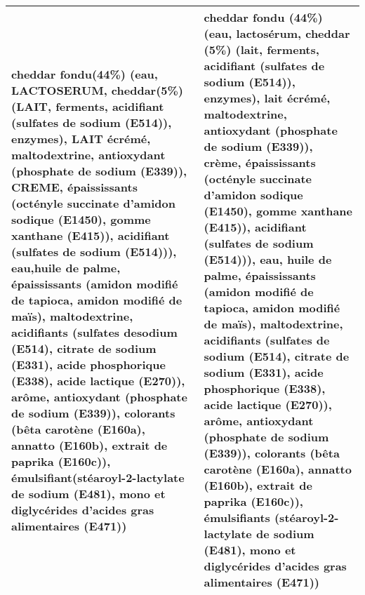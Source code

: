 \begin{longtable}{p{7cm}p{7cm}}
 cheddar fondu(44\%) (eau, LACTOSERUM, cheddar(5\%) (LAIT, ferments, acidifiant (sulfates de sodium (\newline E514)), enzymes), LAIT écrémé, maltodextrine, antioxydant (phosphate de sodium (E339)), CREME, épaississants (\newline octényle succinate d'amidon sodique (E1450), gomme xanthane (E415)), acidifiant (sulfates de sodium (E514))), eau,\newline huile de palme, épaississants (amidon modifié de tapioca, amidon modifié de maïs), maltodextrine, acidifiants (sulfates de\newline sodium (E514), citrate de sodium (E331), acide phosphorique (E338), acide lactique (E270)), arôme, antioxydant (\newline phosphate de sodium (E339)), colorants (bêta carotène (E160a), annatto (E160b), extrait de paprika (E160c)), émulsifiant\newline (stéaroyl-2-lactylate de sodium (E481), mono et diglycérides d'acides gras alimentaires (E471)) &  cheddar fondu (44\%) (eau, lactosérum, cheddar (5\%) (lait, ferments, acidifiant (sulfates de sodium (E514)), enzymes), lait écrémé, maltodextrine, antioxydant (phosphate de sodium (E339)), crème, épaississants (octényle succinate d'amidon sodique (E1450), gomme xanthane (E415)), acidifiant (sulfates de sodium (E514))), eau, huile de palme, épaississants (amidon modifié de tapioca, amidon modifié de maïs), maltodextrine, acidifiants (sulfates de sodium (E514), citrate de sodium (E331), acide phosphorique (E338), acide lactique (E270)), arôme, antioxydant (phosphate de sodium (E339)), colorants (bêta carotène (E160a), annatto (E160b), extrait de paprika (E160c)), émulsifiants (stéaroyl-2-lactylate de sodium (E481), mono et diglycérides d'acides gras alimentaires (E471)) \\ \hline

\end{longtable}
